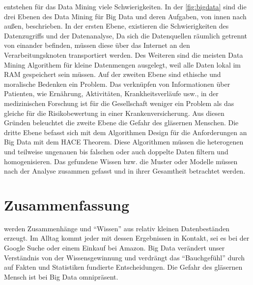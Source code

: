 \documentclass[12pt,journal,compsoc,ngerman]{IEEEtran}
\begin{document}
 entstehen für das Data Mining viele Schwierigkeiten. In der \cref{fig:bigdata} sind die drei Ebenen des Data Mining für Big Data und deren Aufgaben, von innen nach außen, beschrieben. In der ersten Ebene, existieren die Schwierigkeiten des Datenzugriffs und der Datenanalyse, Da sich die Datenquellen räumlich getrennt von einander befinden, müssen diese über das Internet an den Verarbeitungsknoten transportiert werden. Des Weiteren sind  die meisten Data Mining Algorithem für kleine Datenmengen ausgelegt, weil alle Daten lokal im RAM gespeichert sein müssen. Auf der zweiten Ebene sind ethische und moralische Bedenken ein Problem. Das verknüpfen von Informationen über Patienten, wie Ernährung, Aktivitäten, Krankheitsverläufe usw., in der medizinischen Forschung ist für die Gesellschaft weniger ein Problem als das gleiche für die Risikobewertung in einer Krankenversicherung.  Aus diesen Gründen beleuchtet die zweite Ebene die Gefahr des gläsernen Menschen. Die dritte Ebene befasst sich mit dem Algorithmen Design für die Anforderungen an Big Data mit dem HACE Theorem. Diese Algorithmen müssen die heterogenen und teilweise ungenauen bis falschen oder auch doppelte Daten filtern und homogenisieren. Das gefundene Wissen bzw. die Muster oder Modelle müssen nach der Analyse zusammen gefasst und in ihrer Gesamtheit betrachtet werden. 

\section{Zusammenfassung}
 werden Zusammenhänge und \enquote{Wissen} aus relativ kleinen Datenbeständen erzeugt. Im Alltag kommt jeder mit dessen Ergebnissen in Kontakt, sei es bei der Google Suche oder einem Einkauf bei Amazon. Big Data verändert unser Verständnis von der Wissensgewinnung und verdrängt das \enquote{Bauchgefühl} durch auf Fakten und Statistiken fundierte Entscheidungen. Die Gefahr des gläsernen Mensch ist bei Big Data omnipräsent.



\end{document}
